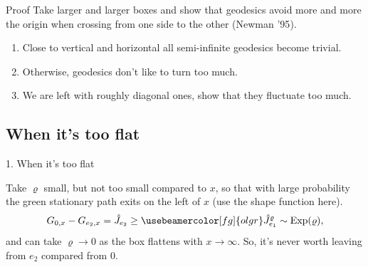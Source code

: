 \documentclass[compress,xcolor=dvipsnames]{beamer}
\newcounter{usedm}
\newcounter{usedn}
\newcommand*{\lppwl}[6][]{

 \FPeval{\m}{round(#6*(#4-#2)/(#4+#5-#2-#3),0)}

 \FPeval{\n}{round(#6*(#5-#3)/(#4+#5-#2-#3),0)}

 \FPeval{\stlength}{(#4+#5-#2-#3)/#6}

 \setcounter{usedm}{0}
 \setcounter{usedn}{0}
 
 \foreach\i in{1,...,{#6}}{
  \FPrandom{\x}

  \FPeval{\y}{(\m-\theusedm)/(\m+\n-\theusedm-\theusedn)}

  \FPeval{\startx}{#2+(\theusedm)*\stlength}
  \FPeval{\starty}{#3+(\theusedn)*\stlength}

  \ifthenelse{\lengthtest{\x pt > \y pt}}{
   \FPset{\endx}{\startx}
   \FPadd{\endy}{\starty}{\stlength}
   \stepcounter{usedn}
  }
  {
   \FPadd{\endx}{\startx}{\stlength}
   \FPset{\endy}{\starty}
   \stepcounter{usedm}
  }
  \draw[#1](\startx,\starty) -- (\endx,\endy);
 }
}
\newcommand*{\vr}{\varrho}
\newcommand*{\expl}[1]{{\usebeamercolor[fg]{expl}#1}}
\newcommand*{\olgr}[1]{{\usebeamercolor[fg]{olgr}#1}}
\begin{document}
\begin{frame}{Proof}
 Take larger and larger boxes and show that geodesics avoid more and more the origin when crossing from one side to the other (\expl{Newman '95}).
 \begin{enumerate}
  \item<2->Close to vertical and horizontal all semi-infinite geodesics become trivial.
  \item<3->Otherwise, geodesics don't like to turn too much.
  \item<4->We are left with roughly diagonal ones, show that they fluctuate too much.
 \end{enumerate}
 \begin{center}
 \end{center}
\end{frame}

\subsection[Flat]{When it's too flat}

\begin{frame}{1. When it's too flat}
 \begin{center}
 \end{center}
 Take \olgr{\(\vr\)} small, but not too small compared to \(x\), so that with large probability the \olgr{green stationary path} exits on the left of \(x\) (use the shape function here).
 \[
  G_{0,x}-G_{e_2,x}=\hat J_{e_2}\ge\olgr{\hat J^\vr_{e_1}\sim\text{Exp}(\vr)},
 \]
 and can take \(\vr\to0\) as the box flattens with \(x\to\infty\). So, it's never worth leaving from \(e_2\) compared from 0.
\end{frame}
\end{document}

